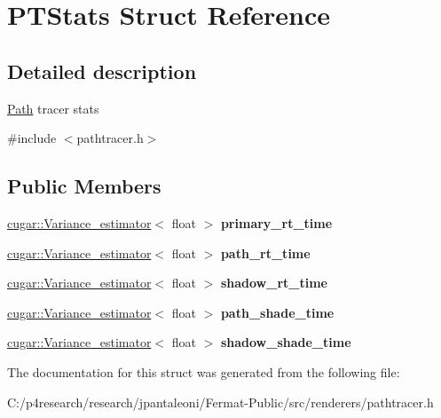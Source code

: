\hypertarget{struct_p_t_stats}{}\section{P\+T\+Stats Struct Reference}
\label{struct_p_t_stats}


\subsection{Detailed description}
\hyperlink{struct_path}{Path} tracer stats 

{\ttfamily \#include $<$pathtracer.\+h$>$}

\subsection*{Public Members}
\begin{DoxyCompactItemize}
\item 
\mbox{\label{struct_p_t_stats_ada74d4f175f43b9d895222de06d4c02c}} 
\hyperlink{structcugar_1_1_variance__estimator}{cugar\+::\+Variance\+\_\+estimator}$<$ float $>$ {\bfseries primary\+\_\+rt\+\_\+time}
\item 
\mbox{\label{struct_p_t_stats_aebe4a4c2b01e49d466ff98deeb87760b}} 
\hyperlink{structcugar_1_1_variance__estimator}{cugar\+::\+Variance\+\_\+estimator}$<$ float $>$ {\bfseries path\+\_\+rt\+\_\+time}
\item 
\mbox{\label{struct_p_t_stats_a53da73d5f2823d5b7841bda7fda12ee2}} 
\hyperlink{structcugar_1_1_variance__estimator}{cugar\+::\+Variance\+\_\+estimator}$<$ float $>$ {\bfseries shadow\+\_\+rt\+\_\+time}
\item 
\mbox{\label{struct_p_t_stats_a5fb105ce2d483cc1595ca95f68aeb400}} 
\hyperlink{structcugar_1_1_variance__estimator}{cugar\+::\+Variance\+\_\+estimator}$<$ float $>$ {\bfseries path\+\_\+shade\+\_\+time}
\item 
\mbox{\label{struct_p_t_stats_a4c2460b7668ab9da30c550374abb3cf7}} 
\hyperlink{structcugar_1_1_variance__estimator}{cugar\+::\+Variance\+\_\+estimator}$<$ float $>$ {\bfseries shadow\+\_\+shade\+\_\+time}
\end{DoxyCompactItemize}


The documentation for this struct was generated from the following file\+:\begin{DoxyCompactItemize}
\item 
C\+:/p4research/research/jpantaleoni/\+Fermat-\/\+Public/src/renderers/pathtracer.\+h\end{DoxyCompactItemize}
